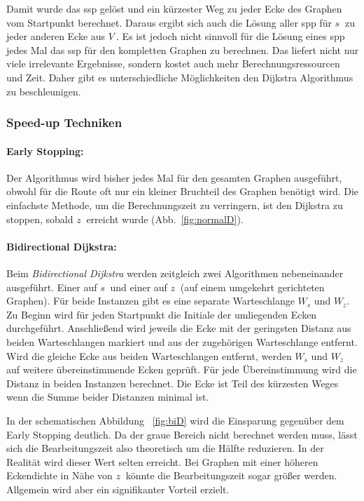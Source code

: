 Damit wurde das \gls{ssp} gelöst und ein kürzester Weg zu jeder Ecke des Graphen vom Startpunkt berechnet.
Daraus ergibt sich auch die Lösung aller \gls{spp} für $s~$ zu jeder anderen Ecke aus $V~$.
Es ist jedoch nicht sinnvoll für die Lösung eines \gls{spp} jedes Mal das \gls{ssp} für den kompletten Graphen zu berechnen.
Das liefert nicht nur viele irrelevante Ergebnisse, sondern kostet auch mehr Berechnungsressourcen und Zeit.
Daher gibt es unterschiedliche Möglichkeiten den Dijkstra Algorithmus zu beschleunigen.

\subsubsection{Speed-up Techniken}

\paragraph*{Early Stopping:}
Der Algorithmus wird bisher jedes Mal für den gesamten Graphen ausgeführt, obwohl für die Route oft nur ein kleiner Bruchteil des Graphen benötigt wird.
Die einfachste Methode, um die Berechnungszeit zu verringern, ist den Dijkstra zu stoppen, sobald $z~$ erreicht wurde (Abb.~\ref{fig:normalD}).

\paragraph*{Bidirectional Dijkstra:}
Beim \textit{Bidirectional Dijkstra} werden zeitgleich zwei Algorithmen nebeneinander ausgeführt.
Einer auf $s~$ und einer auf $z~$ (auf einem umgekehrt gerichteten Graphen).
Für beide Instanzen gibt es eine separate Warteschlange $W_{s}$ und $W_{z}$.
Zu Beginn wird für jeden Startpunkt die Initiale der umliegenden Ecken durchgeführt.
Anschließend wird jeweils die Ecke mit der geringsten Distanz aus beiden Warteschlangen markiert und aus der zugehörigen Warteschlange entfernt.
Wird die gleiche Ecke aus beiden Warteschlangen entfernt, werden $W_{s}$ und $W_{z}$ auf weitere übereinstimmende Ecken geprüft.
Für jede Übereinstimmung wird die Distanz in beiden Instanzen berechnet.
Die Ecke ist Teil des kürzesten Weges wenn die Summe beider Distanzen minimal ist.\par
In der schematischen Abbildung ~\ref{fig:biD} wird die Einsparung gegenüber dem Early Stopping deutlich.
Da der graue Bereich nicht berechnet werden muss, lässt sich die Bearbeitungszeit also theoretisch um die Hälfte reduzieren.
In der Realität wird dieser Wert selten erreicht.
Bei Graphen mit einer höheren Eckendichte in Nähe von $z~$ könnte die Bearbeitungszeit sogar größer werden.
Allgemein wird aber ein signifikanter Vorteil erzielt.


